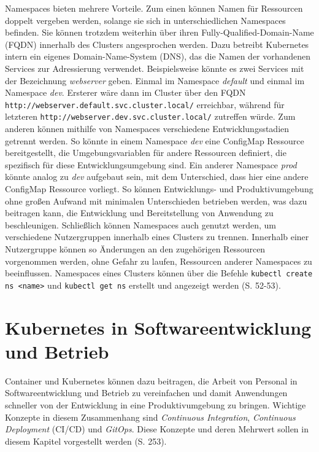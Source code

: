 \documentclass[11pt,a4paper]{article}
\begin{document}
Namespaces bieten mehrere Vorteile. Zum einen können Namen für Ressourcen doppelt vergeben werden,
solange sie sich in unterschiedlichen Namespaces befinden. Sie können trotzdem weiterhin
über ihren Fully-Qualified-Domain-Name (FQDN) innerhalb des Clusters angesprochen werden.
Dazu betreibt Kubernetes intern ein eigenes Domain-Name-System (DNS), das die Namen
der vorhandenen Services zur Adressierung verwendet.
Beispielsweise könnte es zwei Services mit der Bezeichnung \emph{webserver} geben.
Einmal im Namespace \emph{default} und einmal im Namespace \emph{dev}.
Ersterer wäre dann im Cluster über den FQDN \lstinline|http://webserver.default.svc.cluster.local/|
erreichbar, während für letzteren \lstinline|http://webserver.dev.svc.cluster.local/| zutreffen würde.
Zum anderen können mithilfe von Namespaces verschiedene Entwicklungsstadien getrennt werden.
So könnte in einem Namespace \emph{dev} eine ConfigMap Ressource bereitgestellt,
die Umgebungsvariablen für andere Ressourcen definiert, die spezifisch für diese
Entwicklungsumgebung sind. Ein anderer Namespace \emph{prod} könnte analog zu \emph{dev}
aufgebaut sein, mit dem Unterschied, dass hier eine andere ConfigMap Ressource vorliegt.
So können Entwicklungs- und Produktivumgebung ohne großen Aufwand mit minimalen Unterschieden betrieben
werden, was dazu beitragen kann, die Entwicklung und Bereitstellung von Anwendung zu beschleunigen.
Schließlich können Namespaces auch genutzt werden, um verschiedene Nutzergruppen innerhalb eines Clusters
zu trennen. Innerhalb einer Nutzergruppe können so Änderungen an den zugehörigen Ressourcen vorgenommen werden,
ohne Gefahr zu laufen, Ressourcen anderer Namespaces zu beeinflussen.
Namespaces eines Clusters können über die Befehle \lstinline|kubectl create ns <name>| und
\lstinline|kubectl get ns| erstellt und angezeigt werden \cite{Schmeling_Dargatz_2022} (S. 52-53).

\section{Kubernetes in Softwareentwicklung und Betrieb}
Container und Kubernetes können dazu beitragen, die Arbeit von Personal in Softwareentwicklung und
Betrieb zu vereinfachen und damit Anwendungen schneller von der Entwicklung
in eine Produktivumgebung zu bringen.
Wichtige Konzepte in diesem Zusammenhang sind
\emph{Continuous Integration}, \emph{Continuous Deployment} (CI/CD)
und \emph{GitOps}. Diese Konzepte und deren Mehrwert sollen in diesem Kapitel vorgestellt werden \cite{domingus2022cloud} (S. 253).
\end{document}
